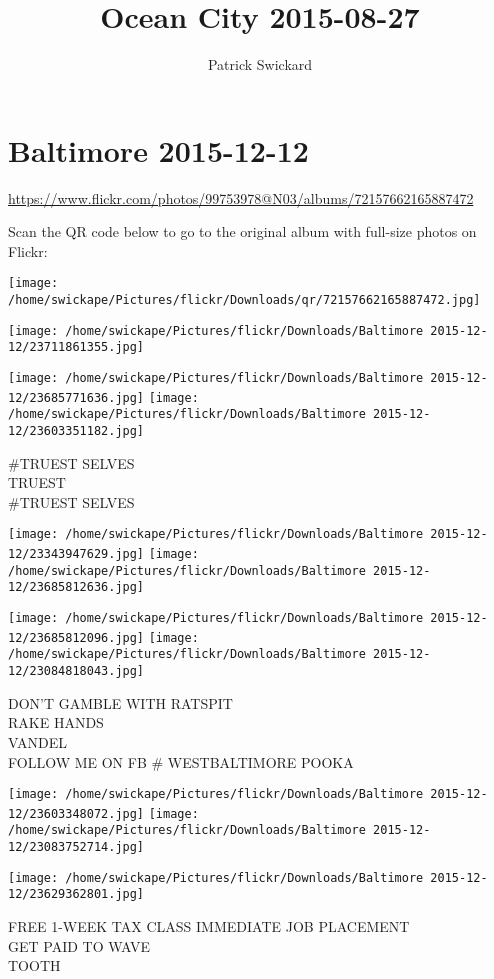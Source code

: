 \documentclass[10pt,letterpaper]{article}
\title{Ocean City 2015-08-27}
\author{Patrick Swickard}
\date{}
\begin{document}
\section*{Baltimore 2015-12-12}

\url{https://www.flickr.com/photos/99753978@N03/albums/72157662165887472}

Scan the QR code below to go to the original album with full-size photos on Flickr:

\texttt{[image: /home/swickape/Pictures/flickr/Downloads/qr/72157662165887472.jpg]}
\pagebreak

\texttt{[image: /home/swickape/Pictures/flickr/Downloads/Baltimore 2015-12-12/23711861355.jpg]}

\vspace{0.25in}
\texttt{[image: /home/swickape/Pictures/flickr/Downloads/Baltimore 2015-12-12/23685771636.jpg]}
\texttt{[image: /home/swickape/Pictures/flickr/Downloads/Baltimore 2015-12-12/23603351182.jpg]}

\#TRUEST SELVES\\
TRUEST\\
\#TRUEST SELVES
\pagebreak

\texttt{[image: /home/swickape/Pictures/flickr/Downloads/Baltimore 2015-12-12/23343947629.jpg]}
\texttt{[image: /home/swickape/Pictures/flickr/Downloads/Baltimore 2015-12-12/23685812636.jpg]}

\texttt{[image: /home/swickape/Pictures/flickr/Downloads/Baltimore 2015-12-12/23685812096.jpg]}
\texttt{[image: /home/swickape/Pictures/flickr/Downloads/Baltimore 2015-12-12/23084818043.jpg]}

DON'T GAMBLE WITH RATSPIT\\
RAKE HANDS\\
VANDEL\\
FOLLOW ME ON FB \# WESTBALTIMORE POOKA
\pagebreak

\texttt{[image: /home/swickape/Pictures/flickr/Downloads/Baltimore 2015-12-12/23603348072.jpg]}
\texttt{[image: /home/swickape/Pictures/flickr/Downloads/Baltimore 2015-12-12/23083752714.jpg]}

\vspace{0.25in}
\texttt{[image: /home/swickape/Pictures/flickr/Downloads/Baltimore 2015-12-12/23629362801.jpg]}

FREE 1{-}WEEK TAX CLASS IMMEDIATE JOB PLACEMENT\\
GET PAID TO WAVE\\
TOOTH
\pagebreak
\end{document}
